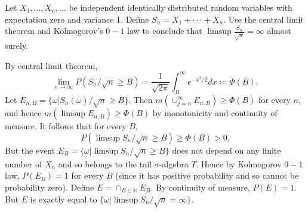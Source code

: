 \begin{exercise}
  Let $X_{1},...,X_{n},...$ be independent identically distributed random variables with expectation zero and variance 1. Define $S_{n}=X_{1}+\cdot\cdot\cdot+X_{n}$. Use the central limit theorem and Kolmogorov's $0-1$ law to conclude that $\limsup \frac{S_{n}}{\sqrt{n}}=\infty$ almost surely.
\end{exercise}
\begin{solution}
  By central limit theorem,
  \begin{equation}
    \lim_{n\rightarrow\infty}P(S_{n}/\sqrt{n}\ge B)=\frac{1}{\sqrt{2\pi}}\int_{B}^{\infty}e^{-x^{2}/2}dx\coloneqq\Phi(B).
  \end{equation}
  Let $E_{n,B}=\{\omega|S_{n}(\omega)/\sqrt{n}\ge B\}$. Then $m(\cup_{j=n}^{\infty}E_{n,B})\ge\Phi(B)$ for every $n$, and hence $m(\limsup E_{n,B})\ge\Phi(B)$ by monotonicity and continuity of measure. It follows that for every $B$,
  \begin{equation}
    P(\limsup S_{n}/\sqrt{n}\ge B)\ge\Phi(B)>0.
  \end{equation}
  But the event $E_{B}=\{\omega|\limsup S_{n}/\sqrt{n}\ge B\}$ does not depend on any finite number of $X_{n}$ and so belongs to the tail $\sigma$-algebra $T$. Hence by Kolmogorov $0-1$ law, $P(E_{B})=1$ for every $B$ (since it has positive probability and so cannot be probability zero). Define $E=\cap_{B\in\mathbb{N}}E_{B}$. By continuity of measure, $P(E)=1$. But $E$ is exactly equal to $\{\omega|\limsup S_{n}/\sqrt{n}=\infty\}$.
\end{solution}
